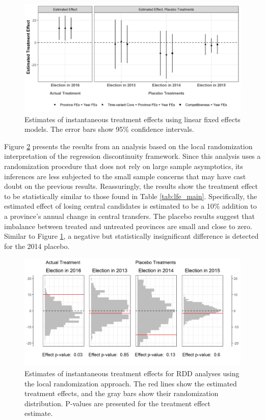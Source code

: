 \documentclass[12pt]{article}
\newcommand{\1}{\mathbbm{1}}
\begin{document}
\begin{figure}[!htbp]
	\centering
	\includegraphics[width=\textwidth]{figure/190618_lfe_placebo.png}
	\captionsetup{singlelinecheck=off}
	\caption[Estimated placebo linear fixed effects treatment effects]{Estimates of instantaneous treatment effects using linear fixed effects models. The error bars show 95\% confidence intervals.}
	\label{fig:lfe_placebo}
\end{figure}

Figure \ref{fig:rdd_placebo} presents the results from an analysis based on the local randomization interpretation of the regression discontinuity framework. Since this analysis uses a randomization procedure that does not rely on large sample asymptotics, its inferences are less subjected to the small sample concerns that may have cast doubt on the previous results. Reassuringly, the results show the treatment effect to be statistically similar to those found in Table \ref{tab:lfe_main}. Specifically, the estimated effect of losing central candidates is estimated to be a 10\% addition to a province's annual change in central transfers. The placebo results suggest that imbalance between treated and untreated provinces are small and close to zero. Similar to Figure \ref{fig:lfe_placebo}, a negative but statistically insignificant difference is detected for the 2014 placebo. 

\begin{figure}[!htbp]
	\centering
	\includegraphics[width=\textwidth]{figure/190618_rdd_results.png}
	\captionsetup{singlelinecheck=off}
	\caption[Estimated RDD treatment effects]{Estimates of instantaneous treatment effects for RDD analyses using the local randomization approach. The red lines show the estimated treatment effects, and the gray bars show their randomization distribution. P-values are presented for the treatment effect estimate.}
	\label{fig:rdd_placebo}
\end{figure}
\end{document}
